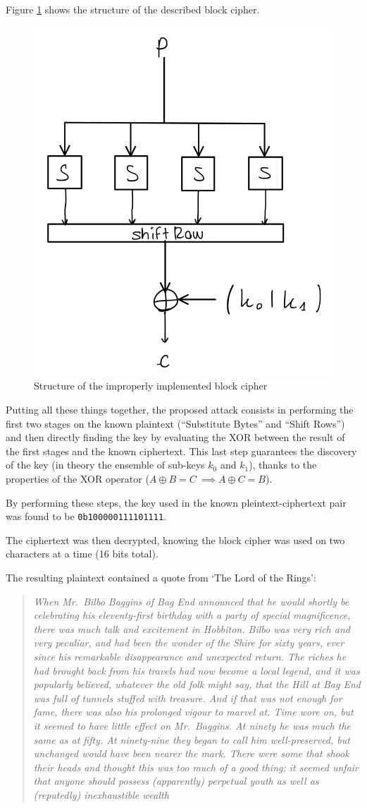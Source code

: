 \documentclass[12pt]{article}
\begin{document}
Figure \ref{fig:3.1} shows the structure of the described block cipher.

\begin{figure} [ht]
   \centering
   \includegraphics[width = .5\linewidth]{improper_block_scheme.jpeg}
   \caption{Structure of the improperly implemented block cipher}
   \label{fig:3.1}
\end{figure}

Putting all these things together, the proposed attack consists in performing the first two stages on the known plaintext (``Substitute Bytes'' and ``Shift Rows'') and then directly finding the key by evaluating the XOR between the result of the first stages and the known ciphertext. This last step guarantees the discovery of the key (in theory the ensemble of sub-keys $k_0$ and $k_1$), thanks to the properties of the XOR operator ($A\oplus B = C\ \implies A\oplus C = B$).

By performing these steps, the key used in the known pleintext-ciphertext pair was found to be \verb|0b100000111101111|.

The ciphertext was then decrypted, knowing the block cipher was used on two characters at a time (16 bits total).

The resulting plaintext contained a quote from `The Lord of the Rings':

\begin{quote}
   \textit{When Mr.\ Bilbo Baggins of Bag End announced that he would shortly be celebrating his eleventy-first birthday with a party of special magnificence, there was much talk and excitement in Hobbiton. 
   Bilbo was very rich and very peculiar, and had been the wonder of the Shire for sixty years, ever since his remarkable disappearance and unexpected return. 
   The riches he had brought back from his travels had now become a local legend, and it was popularly believed, whatever the old folk might say, that the Hill at Bag End was full of tunnels stuffed with treasure. 
   And if that was not enough for fame, there was also his prolonged vigour to marvel at. Time wore on, but it seemed to have little effect on Mr.\ Baggins.
   At ninety he was much the same as at fifty. 
   At ninety-nine they began to call him well-preserved, but unchanged would have been nearer the mark. 
   There were some that shook their heads and thought this was too much of a good thing; it seemed unfair that anyone should possess (apparently) perpetual youth as well as (reputedly) inexhaustible wealth}
\end{quote}
\end{document}
